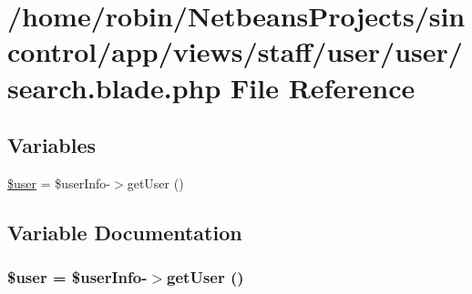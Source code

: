 \hypertarget{user_2user_2search_8blade_8php}{}\section{/home/robin/\+Netbeans\+Projects/sincontrol/app/views/staff/user/user/search.blade.\+php File Reference}
\label{user_2user_2search_8blade_8php}
\subsection*{Variables}
\begin{DoxyCompactItemize}
\item 
\hyperlink{user_2user_2search_8blade_8php_a598ca4e71b15a1313ec95f0df1027ca5}{\$user} = \$user\+Info-\/$>$get\+User ()
\end{DoxyCompactItemize}


\subsection{Variable Documentation}
\hypertarget{user_2user_2search_8blade_8php_a598ca4e71b15a1313ec95f0df1027ca5}{}
\subsubsection[{\$user}]{\setlength{\rightskip}{0pt plus 5cm}\$user = \$user\+Info-\/$>$get\+User ()}\label{user_2user_2search_8blade_8php_a598ca4e71b15a1313ec95f0df1027ca5}
